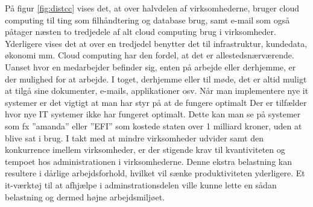 På figur \ref{fig:distcc} vises det, at over halvdelen af virksomhederne, bruger cloud computing til ting som filhåndtering og database brug, samt e-mail som også påtager næsten to tredjedele af alt cloud computing brug i virksomheder. Yderligere vises det at over en tredjedel benytter det til infrastruktur, kundedata, økonomi mm. Cloud computing har den fordel, at det er allestedsnærværende. Uanset hvor en medarbejder befinder sig, enten på arbejde eller derhjemme, er der mulighed for at arbejde. I toget, derhjemme eller til møde, det er altid muligt at tilgå sine dokumenter, e-mails, applikationer osv.
Når man implementere nye it systemer er det vigtigt at man har styr på at de fungere optimalt Der er tilfælder hvor nye IT systemer ikke har fungeret optimalt. Dette kan man se på systemer som fx ”amanda” eller ”EFI” som kostede staten over 1 milliard kroner, uden at blive sat i brug\todo{[kilde]}.
I takt med at mindre virksomheder udvider samt den konkurrence imellem virksomheder, er der stigende krav til kvantiviteten og tempoet hos administrationen i virksomhederne. Denne ekstra belastning kan resultere i dårlige arbejdsforhold, hvilket vil sænke produktiviteten yderligere. Et it-værktøj til at afhjælpe i adminstrationsdelen ville kunne lette en sådan belastning og dermed højne arbejdsmiljøet\citep{It_armil}. 



